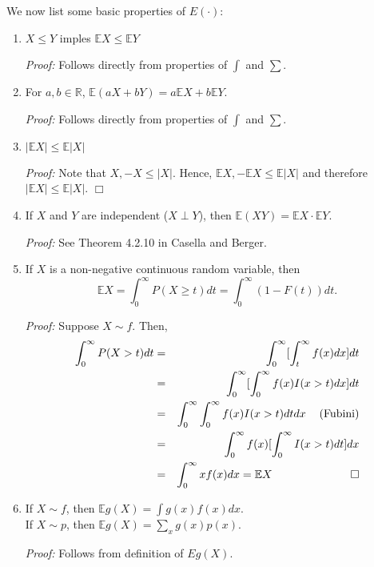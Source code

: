 \documentclass[12pt,oneside]{article}
\begin{document}
\noindent We now list some basic properties of $E(\cdot)$:
\begin{enumerate}
\item  $X \leq Y$ imples $\mathbb{E}X \leq \mathbb{E}Y$

\emph{Proof:}  Follows directly from properties of $\int$ and $\sum$.

\item For $a,b \in \mathbb{R}$, $\mathbb{E}(aX + bY) = a \mathbb{E}X + b \mathbb{E}Y$.

\emph{Proof:}  Follows directly from properties of $\int$ and $\sum$.

\item $|\mathbb{E}X| \leq \mathbb{E}|X|$

\emph{Proof:} Note that $X, -X \leq |X|$.  Hence, $\mathbb{E}X, -\mathbb{E}X \leq \mathbb{E}|X|$ and therefore $|\mathbb{E}X| \leq \mathbb{E}|X|$. $\Box$

\item If $X$ and $Y$ are independent ($X \perp Y$), then $\mathbb{E}(XY) = \mathbb{E}X \cdot \mathbb{E}Y$.

\emph{Proof:} See Theorem 4.2.10 in Casella and Berger.

\item If $X$ is a non-negative continuous random variable, then
 $$\mathbb{E}X = \int_0^\infty P(X \geq t) dt = \int_0^\infty (1-F(t)) dt.$$

\emph{Proof:} Suppose $X \sim f$.  Then,
\begin{eqnarray*} \int_0^\infty P(X>t) dt &=& \int_0^\infty [\int_t^\infty f(x) dx] dt \\
	&=& \int_0^\infty [ \int_0^\infty f(x) I(x>t) dx] dt \\
	&=&  \int_0^\infty \int_0^\infty f(x) I(x>t) dt dx \hspace{12 pt} \mbox{(Fubini)} \\
	&=& \int_0^\infty f(x) [ \int_0^\infty I(x>t) dt] dx \\
	&=& \int_0^\infty x f(x) dx = \mathbb{E}X \hspace{70 pt}\Box \end{eqnarray*}
	
\item If $X \sim f$, then $\mathbb{E}g(X) = \int g(x) f(x) dx$. \\
If $X \sim p$, then $\mathbb{E}g(X)  = \underset{x}{\sum} g(x) p(x) $.
	
\emph{Proof:} Follows from definition of $Eg(X)$.
\end{enumerate}
\end{document}
